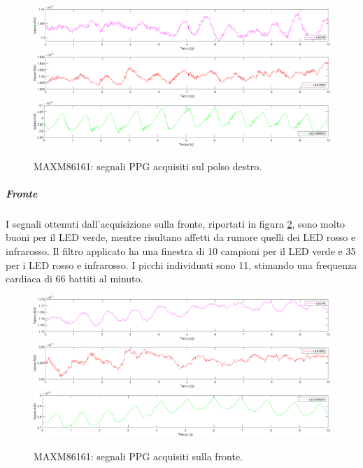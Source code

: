 \begin{figure}[h]
	\centering
	\includegraphics[width=1\linewidth]{ImageFiles/Misure Preliminari/Soggetto 2/maxm86161/polso_inferiore_ir_moving_avg}
	\includegraphics[width=1\linewidth]{ImageFiles/Misure Preliminari/Soggetto 2/maxm86161/polso_inferiore_red_moving_avg}
	\includegraphics[width=1\linewidth]{ImageFiles/Misure Preliminari/Soggetto 2/maxm86161/polso_inferiore_green_moving_avg}
	\caption{MAXM86161: segnali PPG acquisiti sul polso destro.}
	\label{fig:soggetto2_MAXM86161_polso}
\end{figure}

\clearpage

\subparagraph{Fronte}
I segnali ottenuti dall'acquisizione sulla fronte, riportati in figura \ref{fig:soggetto2_MAXM86161_fronte}, sono molto buoni per il LED verde, mentre risultano affetti da rumore quelli dei LED rosso e infrarosso. Il filtro applicato ha una finestra di 10 campioni per il LED verde e 35 per i LED rosso e infrarosso. I picchi individuati sono 11, stimando una frequenza cardiaca di 66 battiti al minuto.

\begin{figure}[h]
	\centering
	\includegraphics[width=1\linewidth]{ImageFiles/Misure Preliminari/Soggetto 2/maxm86161/fronte_ir_moving_avg}
	\includegraphics[width=1\linewidth]{ImageFiles/Misure Preliminari/Soggetto 2/maxm86161/fronte_red_moving_avg}
	\includegraphics[width=1\linewidth]{ImageFiles/Misure Preliminari/Soggetto 2/maxm86161/fronte_green_moving_avg}
	\caption{MAXM86161: segnali PPG acquisiti sulla fronte.}
	\label{fig:soggetto2_MAXM86161_fronte}
\end{figure}


\clearpage